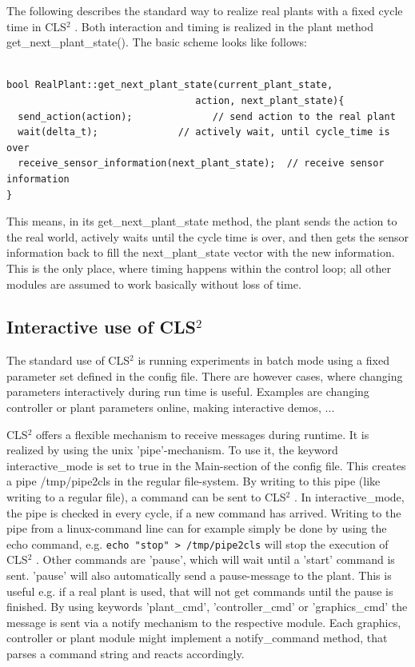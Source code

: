 \documentclass[a4paper,12pt,german]{article}
\newcommand{\cls}{{CLS$^2$ }}
\begin{document}
The following describes the standard way to realize real plants
with a fixed cycle time in \cls. Both interaction and timing 
is realized in the 
plant method get\_next\_plant\_state(). The basic scheme looks like
follows:

\begin{verbatim}

bool RealPlant::get_next_plant_state(current_plant_state, 
                                 action, next_plant_state){
  send_action(action);              // send action to the real plant
  wait(delta_t);              // actively wait, until cycle_time is over
  receive_sensor_information(next_plant_state);  // receive sensor information 
}

\end{verbatim}

This means, in its get\_next\_plant\_state method, the 
plant sends the action to the real world, actively waits until the cycle time
is over, and then gets the sensor information back to fill the next\_plant\_state
vector with the new information.
This is the only place, where timing happens within the control loop; all other
modules are assumed to work basically without loss of time.

\subsection{Interactive use of \cls}

The standard use of \cls is running experiments in batch mode using 
a fixed parameter set defined in the config file. There are however cases,
where changing parameters interactively during run time is useful.
Examples are changing controller or plant parameters online, making interactive
demos, ...

\cls offers a flexible mechanism to receive messages during runtime. It is
realized by using the unix 'pipe'-mechanism. To use it, the keyword
interactive\_mode is set to true in the Main-section of the config file.
This creates a pipe /tmp/pipe2cls in the regular file-system. By writing
to this pipe (like writing to a regular file), 
a command can be sent to \cls. In interactive\_mode, the pipe
is checked in every cycle, if a new command has arrived. Writing to the
pipe from a linux-command line can for example simply be done by using
the echo command, e.g. \lstinline{echo "stop" > /tmp/pipe2cls} will stop the
execution of \cls. Other commands are 'pause', which will wait until
a 'start' command is sent. 'pause' will also automatically send a pause-message to the plant.
This is useful e.g. if a real plant is used, that will not get commands
until the pause is finished. By using keywords 'plant\_cmd', 'controller\_cmd'
or 'graphics\_cmd' the message is sent via a notify mechanism to the
respective module. Each graphics, controller or plant 
module might implement a notify\_command method, that parses a command
string and reacts accordingly.
\end{document}
